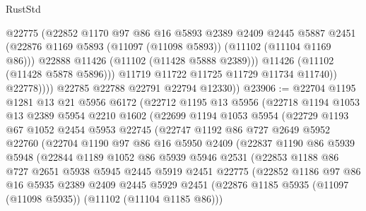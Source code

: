 \begin{lexlean}{RustStd}
\begin{coremodule}
                      @22775
                      (@22852
                        @1170
                        @97
                        @86
                        @16
                        @5893
                        @2389
                        @2409
                        @2445
                        @5887
                        @2451
                        (@22876 @1169 @5893 (@11097 (@11098 @5893)) (@11102 (@11104 @1169 @86)))
                        @22888
                        @11426
                        (@11102 (@11428 @5888 @2389)))
                      @11426
                      (@11102 (@11428 @5878 @5896)))
                    @11719
                    @11722
                    @11725
                    @11729
                    @11734
                    @11740))
                @22778))))
        @22785
        @22788
        @22791
        @22794
        @12330))
@23906 := @22704
    @1195
    @1281
    @13
    @21
    @5956
    @6172
    (@22712
      @1195
      @13
      @5956
      (@22718
        @1194
        @1053
        @13
        @2389
        @5954
        @2210
        @1602
        (@22699
          @1194
          @1053
          @5954
          (@22729
            @1193
            @67
            @1052
            @2454
            @5953
            @22745
            (@22747
              @1192
              @86
              @727
              @2649
              @5952
              @22760
              (@22704
                @1190
                @97
                @86
                @16
                @5950
                @2409
                (@22837
                  @1190
                  @86
                  @5939
                  @5948
                  (@22844
                    @1189
                    @1052
                    @86
                    @5939
                    @5946
                    @2531
                    (@22853
                      @1188
                      @86
                      @727
                      @2651
                      @5938
                      @5945
                      @2445
                      @5919
                      @2451
                      @22775
                      (@22852
                        @1186
                        @97
                        @86
                        @16
                        @5935
                        @2389
                        @2409
                        @2445
                        @5929
                        @2451
                        (@22876 @1185 @5935 (@11097 (@11098 @5935)) (@11102 (@11104 @1185 @86)))

\end{coremodule}
\end{lexlean}
